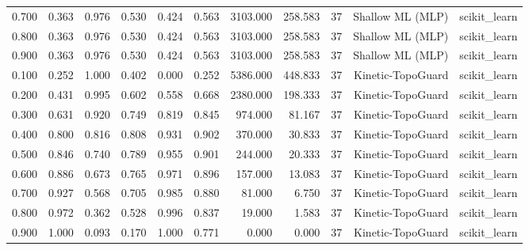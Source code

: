 \begin{tabular}{lrrrrrrrrrr}
0.700 & 0.363 & 0.976 & 0.530 & 0.424 & 0.563 & 3103.000 & 258.583 & 37 & Shallow ML (MLP) & scikit\_learn \\
0.800 & 0.363 & 0.976 & 0.530 & 0.424 & 0.563 & 3103.000 & 258.583 & 37 & Shallow ML (MLP) & scikit\_learn \\
0.900 & 0.363 & 0.976 & 0.530 & 0.424 & 0.563 & 3103.000 & 258.583 & 37 & Shallow ML (MLP) & scikit\_learn \\
0.100 & 0.252 & 1.000 & 0.402 & 0.000 & 0.252 & 5386.000 & 448.833 & 37 & Kinetic-TopoGuard & scikit\_learn \\
0.200 & 0.431 & 0.995 & 0.602 & 0.558 & 0.668 & 2380.000 & 198.333 & 37 & Kinetic-TopoGuard & scikit\_learn \\
0.300 & 0.631 & 0.920 & 0.749 & 0.819 & 0.845 & 974.000 & 81.167 & 37 & Kinetic-TopoGuard & scikit\_learn \\
0.400 & 0.800 & 0.816 & 0.808 & 0.931 & 0.902 & 370.000 & 30.833 & 37 & Kinetic-TopoGuard & scikit\_learn \\
0.500 & 0.846 & 0.740 & 0.789 & 0.955 & 0.901 & 244.000 & 20.333 & 37 & Kinetic-TopoGuard & scikit\_learn \\
0.600 & 0.886 & 0.673 & 0.765 & 0.971 & 0.896 & 157.000 & 13.083 & 37 & Kinetic-TopoGuard & scikit\_learn \\
0.700 & 0.927 & 0.568 & 0.705 & 0.985 & 0.880 & 81.000 & 6.750 & 37 & Kinetic-TopoGuard & scikit\_learn \\
0.800 & 0.972 & 0.362 & 0.528 & 0.996 & 0.837 & 19.000 & 1.583 & 37 & Kinetic-TopoGuard & scikit\_learn \\
0.900 & 1.000 & 0.093 & 0.170 & 1.000 & 0.771 & 0.000 & 0.000 & 37 & Kinetic-TopoGuard & scikit\_learn \\
\bottomrule
\end{tabular}
